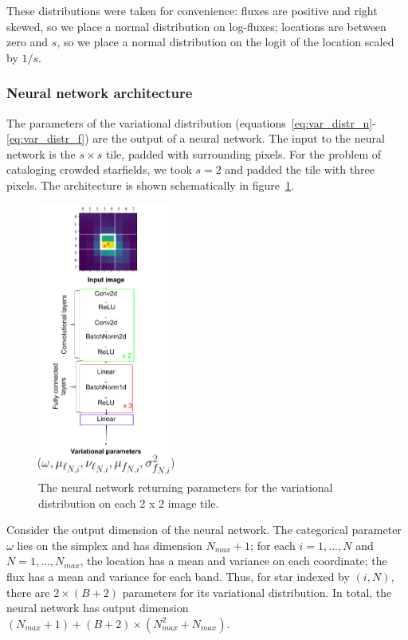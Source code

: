 These distributions were taken for convenience: fluxes are positive and right skewed, so we place a normal distribution on log-fluxes; locations are between zero and $s$, so 
we place a normal distribution on the logit of the location scaled by $1 / s$. 

\subsubsection{Neural network architecture}
The parameters of the variational distribution (equations~\eqref{eq:var_distr_n}-\eqref{eq:var_distr_f}) are the output of a neural network. The input to the neural network is the $s \times s$ tile, padded with surrounding pixels. 
For the problem of cataloging crowded starfields,
we took $s = 2$ and padded the tile with three pixels. The architecture is shown schematically in figure~\ref{fig:starnet_arch}. 

\begin{figure}[!h]
    \centering
    \includegraphics[width=0.4\textwidth]{figures/starnet_archetecture2.png}
    \vspace{-0.5cm}
    \caption{The neural network returning parameters for the variational distribution on each 2 x 2 image tile.}
    \label{fig:starnet_arch}
\end{figure}

Consider the output dimension of the neural network. The categorical parameter $\omega$ lies on the 
simplex and has dimension $N_{max} + 1$; for each $i = 1, ..., N$ and $N = 1, ..., N_{max}$, the location has a mean and variance on each coordinate; the flux has a mean and variance for each band. Thus, for star indexed by $(i, N)$, 
there are $2 \times (B + 2)$ parameters for its variational distribution. In total, the neural network has output dimension $(N_{max} + 1) + (B + 2) \times (N_{max}^2 + N_{max})$. 

